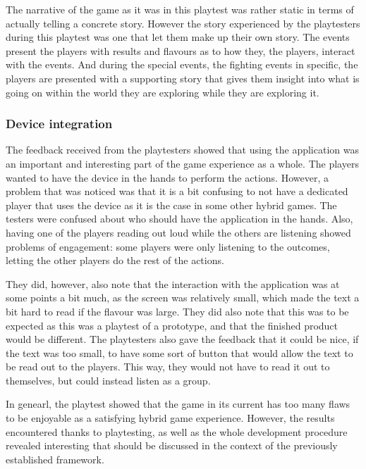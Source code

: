 The narrative of the game as it was in this playtest was rather static in terms of actually telling a concrete story. However the story experienced by the playtesters during this playtest was one that let them make up their own story. The events present the players with results and flavours as to how they, the players, interact with the events. And during the special events, the fighting events in specific, the players are presented with a supporting story that gives them insight into what is going on within the world they are exploring while they are exploring it.

\subsubsection{Device integration}
The feedback received from the playtesters showed that using the application was an important and interesting part of the game experience as a whole. The players wanted to have the device in the hands to perform the actions. However, a problem that was noticed was that it is a bit confusing to not have a dedicated player that uses the device as it is the case in some other hybrid games. The testers were confused about who should have the application in the hands. Also, having one of the players reading out loud while the others are listening showed problems of engagement: some players were only listening to the outcomes, letting the other players do the rest of the actions.

They did, however, also note that the interaction with the application was at some points a bit much, as the screen was relatively small, which made the text a bit hard to read if the flavour was large. They did also note that this was to be expected as this was a playtest of a prototype, and that the finished product would be different. The playtesters also gave the feedback that it could be nice, if the text was too small, to have some sort of button that would allow the text to be read out to the players. This way, they would not have to read it out to themselves, but could instead listen as a group.


In genearl, the playtest showed that the game in its current has too many flaws to be enjoyable as a satisfying hybrid game experience. However, the results encountered thanks to playtesting, as well as the whole development procedure revealed interesting that should be discussed in the context of the previously established framework.